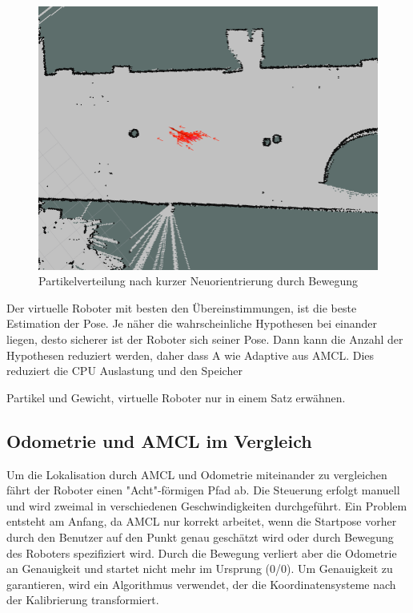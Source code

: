 \documentclass[11pt,a4paper]{article}
\begin{document}
{\begin{figure}[h]
	\includegraphics[width=\linewidth]{pictures/drive_little.jpg}
	\caption{Partikelverteilung nach kurzer Neuorientrierung durch Bewegung}
\end{figure}
 
Der virtuelle Roboter  mit besten den Übereinstimmungen, ist die beste Estimation der Pose.
Je n\"aher die wahrscheinliche Hypothesen bei einander liegen, desto sicherer ist der Roboter sich seiner Pose. Dann kann die Anzahl der Hypothesen reduziert werden, daher dass A wie Adaptive aus AMCL. Dies reduziert die CPU Auslastung und den Speicher

Partikel und Gewicht, virtuelle Roboter nur in einem Satz erwähnen.

 


\subsection{Odometrie und AMCL im Vergleich}
Um die Lokalisation durch AMCL und Odometrie miteinander zu vergleichen f\"ahrt der Roboter einen "Acht"-f\"ormigen Pfad ab. Die Steuerung erfolgt manuell und wird zweimal in verschiedenen Geschwindigkeiten durchgef\"uhrt. Ein Problem entsteht am Anfang, da AMCL nur korrekt arbeitet, wenn die Startpose vorher durch den Benutzer auf den Punkt genau gesch\"atzt wird oder durch Bewegung des Roboters spezifiziert wird. Durch die Bewegung verliert aber die Odometrie an Genauigkeit und startet nicht mehr im Ursprung (0/0). Um Genauigkeit zu garantieren, wird ein Algorithmus verwendet, der die Koordinatensysteme nach der Kalibrierung transformiert.

}
\end{document}
